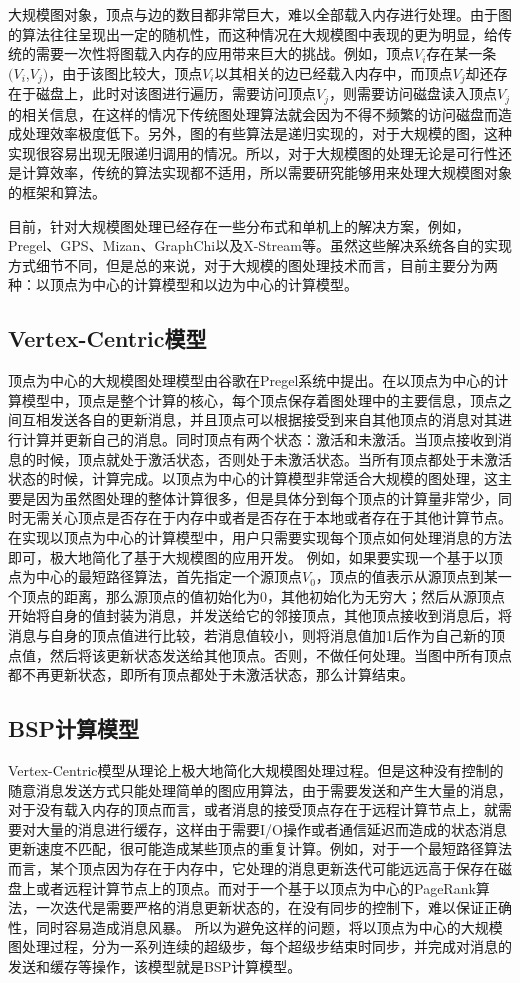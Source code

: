大规模图对象，顶点与边的数目都非常巨大，难以全部载入内存进行处理。由于图的算法往往呈现出一定的随机性，而这种情况在大规模图中表现的更为明显，给传统的需要一次性将图载入内存的应用带来巨大的挑战。例如，顶点$V_i$存在某一条$(V_i$,$V_j)$，由于该图比较大，顶点$V_i$以其相关的边已经载入内存中，而顶点$V_j$却还存在于磁盘上，此时对该图进行遍历，需要访问顶点$V_j$，则需要访问磁盘读入顶点$V_j$的相关信息，在这样的情况下传统图处理算法就会因为不得不频繁的访问磁盘而造成处理效率极度低下。另外，图的有些算法是递归实现的，对于大规模的图，这种实现很容易出现无限递归调用的情况。所以，对于大规模图的处理无论是可行性还是计算效率，传统的算法实现都不适用，所以需要研究能够用来处理大规模图对象的框架和算法。

目前，针对大规模图处理已经存在一些分布式和单机上的解决方案，例如，Pregel、GPS、Mizan、GraphChi以及X-Stream等。虽然这些解决系统各自的实现方式细节不同，但是总的来说，对于大规模的图处理技术而言，目前主要分为两种：以顶点为中心的计算模型和以边为中心的计算模型。

\subsection{Vertex-Centric模型}
顶点为中心的大规模图处理模型由谷歌在Pregel系统中提出。在以顶点为中心的计算模型中，顶点是整个计算的核心，每个顶点保存着图处理中的主要信息，顶点之间互相发送各自的更新消息，并且顶点可以根据接受到来自其他顶点的消息对其进行计算并更新自己的消息。同时顶点有两个状态：激活和未激活。当顶点接收到消息的时候，顶点就处于激活状态，否则处于未激活状态。当所有顶点都处于未激活状态的时候，计算完成。以顶点为中心的计算模型非常适合大规模的图处理，这主要是因为虽然图处理的整体计算很多，但是具体分到每个顶点的计算量非常少，同时无需关心顶点是否存在于内存中或者是否存在于本地或者存在于其他计算节点。在实现以顶点为中心的计算模型中，用户只需要实现每个顶点如何处理消息的方法即可，极大地简化了基于大规模图的应用开发。
例如，如果要实现一个基于以顶点为中心的最短路径算法，首先指定一个源顶点$V_0$，顶点的值表示从源顶点到某一个顶点的距离，那么源顶点的值初始化为0，其他初始化为无穷大；然后从源顶点开始将自身的值封装为消息，并发送给它的邻接顶点，其他顶点接收到消息后，将消息与自身的顶点值进行比较，若消息值较小，则将消息值加1后作为自己新的顶点值，然后将该更新状态发送给其他顶点。否则，不做任何处理。当图中所有顶点都不再更新状态，即所有顶点都处于未激活状态，那么计算结束。

\subsection{BSP计算模型}
Vertex-Centric模型从理论上极大地简化大规模图处理过程。但是这种没有控制的随意消息发送方式只能处理简单的图应用算法，由于需要发送和产生大量的消息，对于没有载入内存的顶点而言，或者消息的接受顶点存在于远程计算节点上，就需要对大量的消息进行缓存，这样由于需要I/O操作或者通信延迟而造成的状态消息更新速度不匹配，很可能造成某些顶点的重复计算。例如，对于一个最短路径算法而言，某个顶点因为存在于内存中，它处理的消息更新迭代可能远远高于保存在磁盘上或者远程计算节点上的顶点。而对于一个基于以顶点为中心的PageRank算法，一次迭代是需要严格的消息更新状态的，在没有同步的控制下，难以保证正确性，同时容易造成消息风暴。
所以为避免这样的问题，将以顶点为中心的大规模图处理过程，分为一系列连续的超级步，每个超级步结束时同步，并完成对消息的发送和缓存等操作，该模型就是BSP计算模型。

